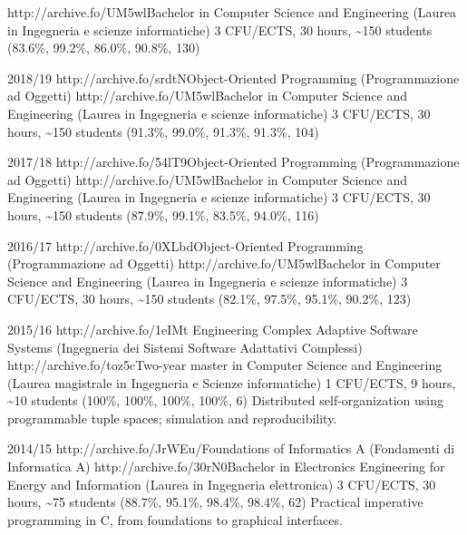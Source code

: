 \begin{outerlist}
        {http://archive.fo/UM5wl}{Bachelor in Computer Science and Engineering (Laurea in Ingegneria e scienze informatiche)}
        {3 CFU/ECTS, 30 hours, \textasciitilde{}150 students}
        {(83.6\%, 99.2\%, 86.0\%, 90.8\%, 130)}
        {\oopjava}
    \item[2018/19]
        \unibocourse
        {http://archive.fo/srdtN}{Object-Oriented Programming (Programmazione ad Oggetti)}
        {http://archive.fo/UM5wl}{Bachelor in Computer Science and Engineering (Laurea in Ingegneria e scienze informatiche)}
        {3 CFU/ECTS, 30 hours, \textasciitilde{}150 students}
        {(91.3\%, 99.0\%, 91.3\%, 91.3\%, 104)}
        {\oopjava}
    \item[2017/18]
        \unibocourse
        {http://archive.fo/54lT9}{Object-Oriented Programming (Programmazione ad Oggetti)}
        {http://archive.fo/UM5wl}{Bachelor in Computer Science and Engineering (Laurea in Ingegneria e scienze informatiche)}
        {3 CFU/ECTS, 30 hours, \textasciitilde{}150 students}
        {(87.9\%, 99.1\%, 83.5\%, 94.0\%, 116)}
        {\oopjava}
    \item[2016/17]
        \unibocourse
        {http://archive.fo/0XLbd}{Object-Oriented Programming (Programmazione ad Oggetti)}
        {http://archive.fo/UM5wl}{Bachelor in Computer Science and Engineering (Laurea in Ingegneria e scienze informatiche)}
        {3 CFU/ECTS, 30 hours, \textasciitilde{}150 students}
        {(82.1\%, 97.5\%, 95.1\%, 90.2\%, 123)}
        {\oopjava}
    \item[2015/16]
        \unibocourse
        {http://archive.fo/1eIMt}{
            Engineering Complex Adaptive Software Systems
            (Ingegneria dei Sistemi Software Adattativi Complessi)
        }
        {http://archive.fo/toz5c}{Two-year master in Computer Science and Engineering (Laurea magistrale in Ingegneria e Scienze informatiche)}
        {1 CFU/ECTS, 9 hours, \textasciitilde{}10 students}
        {(100\%, 100\%, 100\%, 100\%, 6)}
        {Distributed self-organization using programmable tuple spaces; simulation and reproducibility.}
    \item[2014/15]
        \unibocourse
        {http://archive.fo/JrWEu/}{Foundations of Informatics A (Fondamenti di Informatica A)}
        {http://archive.fo/30rN0}{Bachelor in Electronics Engineering for Energy and Information (Laurea in Ingegneria elettronica)}
        {3 CFU/ECTS, 30 hours, \textasciitilde{}75 students}
        {(88.7\%, 95.1\%, 98.4\%, 98.4\%, 62)}
        {
            Practical imperative programming in C, from foundations to graphical interfaces.
}
\end{outerlist}
